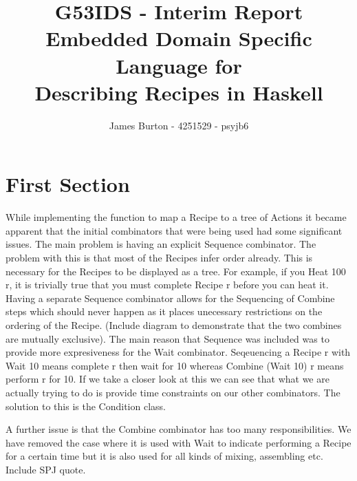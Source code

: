 \documentclass[12pt]{article}
\title
{ 
    G53IDS - Interim Report \\
    \hfill \break
    \large Embedded Domain Specific Language for \\
    Describing Recipes in Haskell
}
\author{James Burton - 4251529 - psyjb6}
\begin{document}
    \maketitle
    \newpage

    \section{First Section}

    While implementing the function to map a Recipe to a tree of Actions it became apparent that the initial
    combinators that were being used had some significant issues. The main problem is having an explicit Sequence
    combinator. The problem with this is that most of the Recipes infer order already. This is necessary for the
    Recipes to be displayed as a tree. For example, if you Heat 100 r, it is trivially true that you must complete
    Recipe r before you can heat it. Having a separate Sequence combinator allows for the Sequencing of Combine steps
    which should never happen as it places unecessary restrictions on the ordering of the Recipe. (Include diagram
    to demonstrate that the two combines are mutually exclusive). The main reason that Sequence was included was to
    provide more expresiveness for the Wait combinator. Seqeuencing a Recipe r with Wait 10 means complete r then
    wait for 10 whereas Combine (Wait 10) r means perform r for 10. If we take a closer look at this we can see that
    what we are actually trying to do is provide time constraints on our other combinators. The solution to this is
    the Condition class.
    
    A further issue is that the Combine combinator has too many responsibilities. We have removed the case where it
    is used with Wait to indicate performing a Recipe for a certain time but it is also used for all kinds of mixing,
    assembling etc. Include SPJ quote.    
     
\end{document}
